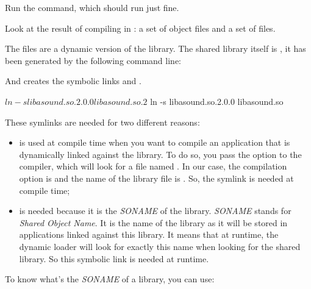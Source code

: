 
Run the  command, which should run just fine.

Look at the result of compiling in : a set of object files
and a set of  files.

The  files are a dynamic version of the
library. The shared library itself is , it has
been generated by the following command line:


And creates the symbolic links  and
.

\begin{bashinput}
$ ln -s libasound.so.2.0.0 libasound.so.2
$ ln -s libasound.so.2.0.0 libasound.so
\end{bashinput}

These symlinks are needed for two different reasons:

\begin{itemize}
\item {} is used at compile time when you want to
  compile an application that is dynamically linked against the
  library. To do so, you pass the  option to the
  compiler, which will look for a file named
  . In our case, the compilation option is
   and the name of the library file is
  . So, the  symlink is needed
  at compile time;
\item {} is needed because it is the {\em SONAME}
  of the library. {\em SONAME} stands for {\em Shared Object Name}. It
  is the name of the library as it will be stored in applications
  linked against this library. It means that at runtime, the dynamic
  loader will look for exactly this name when looking for the shared
  library. So this symbolic link is needed at runtime.
\end{itemize}

To know what's the {\em SONAME} of a library, you can use:


